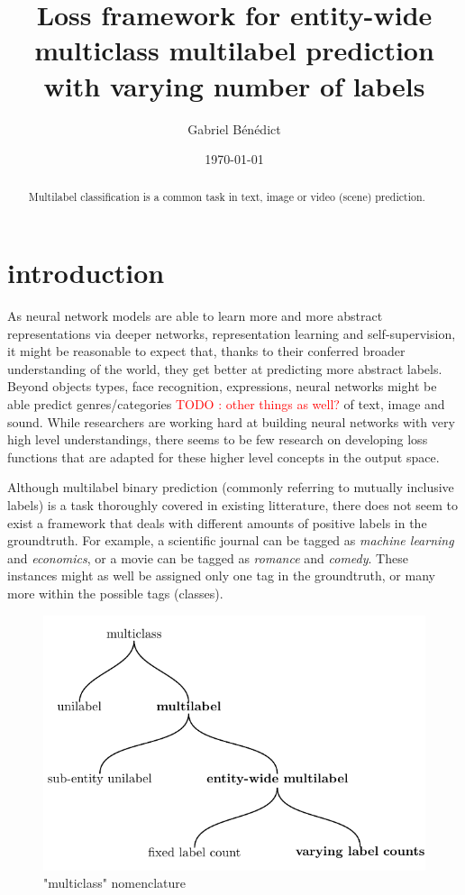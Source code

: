 \documentclass[sigconf,natbib,screen=true,review=true,anonymous]{acmart}
\author{Gabriel Bénédict}
\date{\today}
\title{}
\newcommand\todo[1]{\textcolor{red}{TODO : #1}}
\begin{document}
\title{Loss framework for entity-wide multiclass multilabel prediction with varying number of labels}


\begin{abstract}
Multilabel classification is a common task in text, image or video (scene) prediction.
\end{abstract}



\maketitle

\acresetall

\section{introduction}
\label{sec:org26fb9e7}

As neural network models are able to learn more and more abstract representations via deeper networks, representation learning and self-supervision, it might be reasonable to expect that, thanks to their conferred broader understanding of the world, they get better at predicting more abstract labels. Beyond objects types, face recognition, expressions, neural networks might be able predict genres/categories \todo{other things as well?} of text, image and sound. While researchers are working hard at building neural networks with very high level understandings, there seems to be few research on developing loss functions that are adapted for these higher level concepts in the output space.

Although multilabel binary prediction (commonly referring to mutually inclusive labels) is a task thoroughly covered in existing litterature, there does not seem to exist a framework that deals with different amounts of positive labels in the groundtruth. For example, a scientific journal can be tagged as \emph{machine learning} and \emph{economics}, or a movie can be tagged as \emph{romance} and \emph{comedy}. These instances might as well be assigned only one tag in the groundtruth, or many more within the possible tags (classes).

\begin{figure}[htbp]
\centering
\includegraphics[width=.9\linewidth]{./tree/Tree.pdf}
\caption{\label{fig:tree}
"multiclass" nomenclature}
\end{figure}
\end{document}
